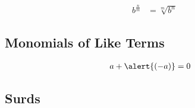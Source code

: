 \begin{notation}
\begin{align}
b^{\frac{n}{m}} &= \sqrt[m]{b^n}	 \label{eq:potr} 
\end{align}
\end{notation}





\subsection{Monomials of Like Terms}








\begin{definition}
\begin{subequations}
\begin{align}
a + \alert{(-a)} &= 0 \label{eq:ai}
\end{align}
\end{subequations}
\end{definition}




\subsection{Surds}

